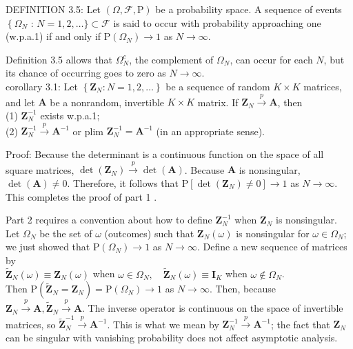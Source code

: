 \documentclass[10pt]{article}
\begin{document}
DEFINITION 3.5: Let $(\Omega, \mathscr{F}, \mathrm{P})$ be a probability space. A sequence of events $\left\{\Omega_{N}\right.$ : $N=1,2, \ldots\} \subset \mathscr{F}$ is said to occur with probability approaching one (w.p.a.1) if and only if $\mathrm{P}\left(\Omega_{N}\right) \rightarrow 1$ as $N \rightarrow \infty$.

Definition 3.5 allows that $\Omega_{N}^{c}$, the complement of $\Omega_{N}$, can occur for each $N$, but its chance of occurring goes to zero as $N \rightarrow \infty$.\\
corollary 3.1: Let $\left\{\mathbf{Z}_{N}: N=1,2, \ldots\right\}$ be a sequence of random $K \times K$ matrices, and let $\mathbf{A}$ be a nonrandom, invertible $K \times K$ matrix. If $\mathbf{Z}_{N} \xrightarrow{p} \mathbf{A}$, then\\
(1) $\mathbf{Z}_{N}^{-1}$ exists w.p.a.1;\\
(2) $\mathbf{Z}_{N}^{-1} \xrightarrow{p} \mathbf{A}^{-1}$ or plim $\mathbf{Z}_{N}^{-1}=\mathbf{A}^{-1}$ (in an appropriate sense).

Proof: Because the determinant is a continuous function on the space of all square matrices, $\operatorname{det}\left(\mathbf{Z}_{N}\right) \xrightarrow{p} \operatorname{det}(\mathbf{A})$. Because $\mathbf{A}$ is nonsingular, $\operatorname{det}(\mathbf{A}) \neq 0$. Therefore, it follows that $\mathrm{P}\left[\operatorname{det}\left(\mathbf{Z}_{N}\right) \neq 0\right] \rightarrow 1$ as $N \rightarrow \infty$. This completes the proof of part 1 .

Part 2 requires a convention about how to define $\mathbf{Z}_{N}^{-1}$ when $\mathbf{Z}_{N}$ is nonsingular. Let $\Omega_{N}$ be the set of $\omega$ (outcomes) such that $\mathbf{Z}_{N}(\omega)$ is nonsingular for $\omega \in \Omega_{N}$; we just showed that $\mathrm{P}\left(\Omega_{N}\right) \rightarrow 1$ as $N \rightarrow \infty$. Define a new sequence of matrices by\\
$\tilde{\mathbf{Z}}_{N}(\omega) \equiv \mathbf{Z}_{N}(\omega)$ when $\omega \in \Omega_{N}, \quad \tilde{\mathbf{Z}}_{N}(\omega) \equiv \mathbf{I}_{K}$ when $\omega \notin \Omega_{N}$.\\
Then $\mathrm{P}\left(\tilde{\mathbf{Z}}_{N}=\mathbf{Z}_{N}\right)=\mathrm{P}\left(\Omega_{N}\right) \rightarrow 1$ as $N \rightarrow \infty$. Then, because $\mathbf{Z}_{N} \xrightarrow{p} \mathbf{A}, \tilde{\mathbf{Z}}_{N} \xrightarrow{p} \mathbf{A}$. The inverse operator is continuous on the space of invertible matrices, so $\tilde{\mathbf{Z}}_{N}^{-1} \xrightarrow{p} \mathbf{A}^{-1}$. This is what we mean by $\mathbf{Z}_{N}^{-1} \xrightarrow{p} \mathbf{A}^{-1}$; the fact that $\mathbf{Z}_{N}$ can be singular with vanishing probability does not affect asymptotic analysis.
\end{document}
